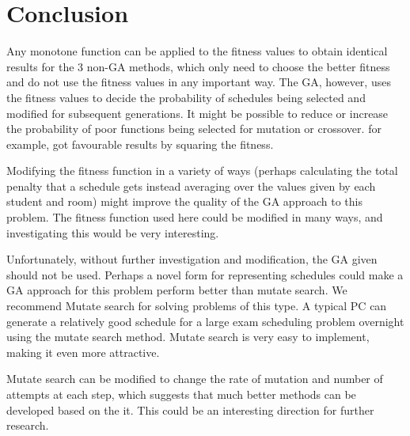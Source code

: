 \documentclass[letterpaper]{article}
\begin{document}
\section{Conclusion}
  Any monotone function can be applied to the fitness values to obtain identical 
  results for the 3 non-GA methods, which only need to choose the better fitness 
  and do not use the fitness values in any important way. The GA, however, uses 
  the fitness values to decide the probability of schedules being selected and 
  modified for subsequent generations. It might be possible to reduce or increase 
  the probability of poor functions being selected for mutation or crossover.
  \citeauthor*{pdf:solvingexam} \citeyearpar{pdf:solvingexam} for example, got 
  favourable results by squaring the fitness.
  
  Modifying the fitness function in a variety of ways (perhaps calculating the 
  total penalty that a schedule gets instead averaging over the values given by 
  each student and room) might improve the  quality of the GA approach to this 
  problem. The fitness function used here could  be modified in many ways, and 
  investigating this would be very interesting.

  Unfortunately, without further investigation and modification, the GA given 
  should not be used. Perhaps a novel form for representing schedules could make 
  a GA approach for this problem perform better than mutate search. We recommend 
  Mutate search for solving problems of this type. A typical PC can generate a 
  relatively good schedule for a large exam scheduling problem overnight using the
  mutate search method. Mutate search is very easy to implement, making it even 
  more attractive.

  Mutate search can be modified to change the rate of mutation and number of attempts 
  at each step, which suggests that much better methods can be developed based on the 
  it. This could be an interesting direction for further research.
  
\nocite{*}


\end{document}
